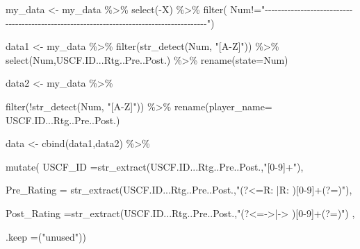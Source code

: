 \documentclass[
]{article}
\newenvironment{Shaded}{\begin{snugshade}}{\end{snugshade}}
\newcommand{\AttributeTok}[1]{\textcolor[rgb]{0.77,0.63,0.00}{#1}}
\newcommand{\FunctionTok}[1]{\textcolor[rgb]{0.00,0.00,0.00}{#1}}
\newcommand{\NormalTok}[1]{#1}
\newcommand{\OtherTok}[1]{\textcolor[rgb]{0.56,0.35,0.01}{#1}}
\newcommand{\SpecialCharTok}[1]{\textcolor[rgb]{0.00,0.00,0.00}{#1}}
\newcommand{\StringTok}[1]{\textcolor[rgb]{0.31,0.60,0.02}{#1}}
\begin{document}
\begin{Shaded}
\begin{Highlighting}[]
\NormalTok{my\_data }\OtherTok{\textless{}{-}}\NormalTok{ my\_data }\SpecialCharTok{\%\textgreater{}\%}
  \FunctionTok{select}\NormalTok{(}\SpecialCharTok{{-}}\NormalTok{X) }\SpecialCharTok{\%\textgreater{}\%}
  \FunctionTok{filter}\NormalTok{(}
\NormalTok{Num}\SpecialCharTok{!=}\StringTok{"{-}{-}{-}{-}{-}{-}{-}{-}{-}{-}{-}{-}{-}{-}{-}{-}{-}{-}{-}{-}{-}{-}{-}{-}{-}{-}{-}{-}{-}{-}{-}{-}{-}{-}{-}{-}{-}{-}{-}{-}{-}{-}{-}{-}{-}{-}{-}{-}{-}{-}{-}{-}{-}{-}{-}{-}{-}{-}{-}{-}{-}{-}{-}{-}{-}{-}{-}{-}{-}{-}{-}{-}{-}{-}{-}{-}{-}{-}{-}{-}{-}{-}{-}{-}{-}{-}{-}{-}{-}"}\NormalTok{) }
\end{Highlighting}
\end{Shaded}

\begin{Shaded}
\begin{Highlighting}[]
\NormalTok{data1 }\OtherTok{\textless{}{-}}\NormalTok{ my\_data }\SpecialCharTok{\%\textgreater{}\%}
  \FunctionTok{filter}\NormalTok{(}\FunctionTok{str\_detect}\NormalTok{(Num, }\StringTok{"[A{-}Z]"}\NormalTok{)) }\SpecialCharTok{\%\textgreater{}\%}
  \FunctionTok{select}\NormalTok{(Num,USCF.ID...Rtg..Pre..Post.) }\SpecialCharTok{\%\textgreater{}\%}
  \FunctionTok{rename}\NormalTok{(}\AttributeTok{state=}\NormalTok{Num)}

\NormalTok{data2 }\OtherTok{\textless{}{-}}\NormalTok{ my\_data }\SpecialCharTok{\%\textgreater{}\%}

  \FunctionTok{filter}\NormalTok{(}\SpecialCharTok{!}\FunctionTok{str\_detect}\NormalTok{(Num, }\StringTok{"[A{-}Z]"}\NormalTok{)) }\SpecialCharTok{\%\textgreater{}\%}
  \FunctionTok{rename}\NormalTok{(}\AttributeTok{player\_name=}\NormalTok{ USCF.ID...Rtg..Pre..Post.)}

\NormalTok{data }\OtherTok{\textless{}{-}} \FunctionTok{cbind}\NormalTok{(data1,data2) }\SpecialCharTok{\%\textgreater{}\%}
  
  \FunctionTok{mutate}\NormalTok{( }\AttributeTok{USCF\_ID =}\FunctionTok{str\_extract}\NormalTok{(USCF.ID...Rtg..Pre..Post.,}\StringTok{"[0{-}9]+"}\NormalTok{),}

          \AttributeTok{Pre\_Rating =} \FunctionTok{str\_extract}\NormalTok{(USCF.ID...Rtg..Pre..Post.,}\StringTok{"(?\textless{}=R: |R:  )[0{-}9]+(?=)"}\NormalTok{),}

          \AttributeTok{Post\_Rating =}\FunctionTok{str\_extract}\NormalTok{(USCF.ID...Rtg..Pre..Post.,}\StringTok{"(?\textless{}={-}\textgreater{}|{-}\textgreater{} )[0{-}9]+(?=)"}\NormalTok{) ,}

          \AttributeTok{.keep =}\NormalTok{(}\StringTok{"unused"}\NormalTok{))}
\end{Highlighting}
\end{Shaded}
\end{document}
